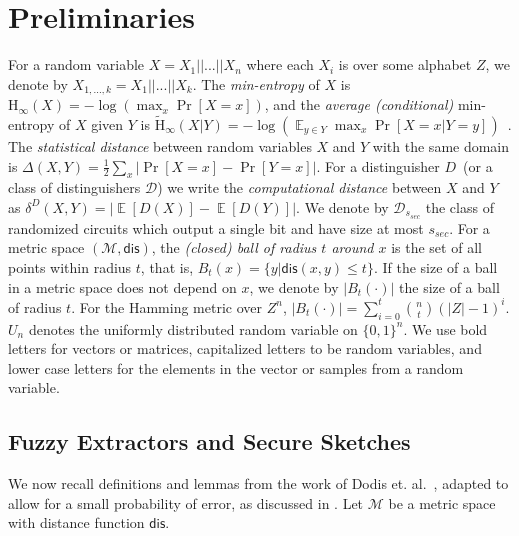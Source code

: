 \documentclass[11pt]{article}
\DeclareMathOperator*{\expe}{\mathbb{E}}
\newcommand{\dis}{\ensuremath{\mathsf{dis}}}
\newcommand{\Hoo}{\mathrm{H}_\infty}
\newcommand{\Hav}{\tilde{\mathrm{H}}_\infty}
\def\col{\mathrm{Col}}
\newcommand{\authnote}[2]{{\textcolor{red}{\textsf{#1 notes: }\textcolor{blue}{ #2}}\marginpar{\textcolor{red}{\textbf{!!!!!}}}}}
\newcommand{\authnote}[2]{}
\newcommand{\lnote}[1]{{\authnote{Leo}{#1}}}
\begin{document}
\section{Preliminaries}
\label{sec:preliminaries}
For a random variable $X = X_1||...|| X_n$ where each $X_i$ is over some alphabet $Z$, we denote by $X_{1,..., k} = X_1||...|| X_k$.  The {\em min-entropy} of $X$ is $\Hoo(X) = -\log(\max_x \Pr[X=x])$, 
and the {\em average (conditional)} min-entropy of $X$ given $Y$ is  $\Hav(X|Y) = -\log(\expe_{y\in Y} \max_{x} \Pr[X=x|Y=y])$~\cite[Section 2.4]{DBLP:journals/siamcomp/DodisORS08}.  
The {\em statistical distance} between random variables $X$ and $Y$ with the same domain is $\Delta(X,Y) = \frac12 \sum_x |\Pr[X=x] - \Pr[Y=x]|$. %
For a distinguisher $D$~(or a class of distinguishers $\mathcal{D}$) we write the \emph{computational distance} between $X$ and $Y$ as $\delta^D(X,Y) = \left| \expe[D(X)]-\expe[D(Y)]\right |$.  We denote by $\mathcal{D}_{s_{sec}}$ the class of randomized circuits which output a single bit and have size at most $s_{sec}$.
For a metric space $(\mathcal{M}, \dis)$, the \emph{(closed) ball of radius $t$ around $x$} is the set of all points within radius $t$, that is, $B_t(x) = \{y| \dis(x, y)\leq t\}$.  If the size of a ball in a metric space does not depend on $x$, we denote by $|B_t(\cdot)|$ the size of a ball of radius $t$.  For the Hamming metric over $Z^n$, $|B_t(\cdot)| = \sum_{i=0}^t {n \choose t} (|Z|-1)^i $.  $U_n$ denotes the uniformly  distributed random variable on $\{0,1\}^n$.
We use bold letters for vectors or matrices, capitalized letters to be random variables, and lower case letters for the elements in the vector or samples from a random variable. 

\subsection{Fuzzy Extractors and Secure Sketches}
\label{sec:fuzzy extractors}

We now recall definitions and lemmas from the work of Dodis et. al.~\cite[Sections 2.5--4.1]{DBLP:journals/siamcomp/DodisORS08}, adapted to allow for a small probability of error, as discussed in \cite[Sections 8]{DBLP:journals/siamcomp/DodisORS08}.  Let $\mathcal{M}$ be a metric space with distance function $\dis$.%
\end{document}
